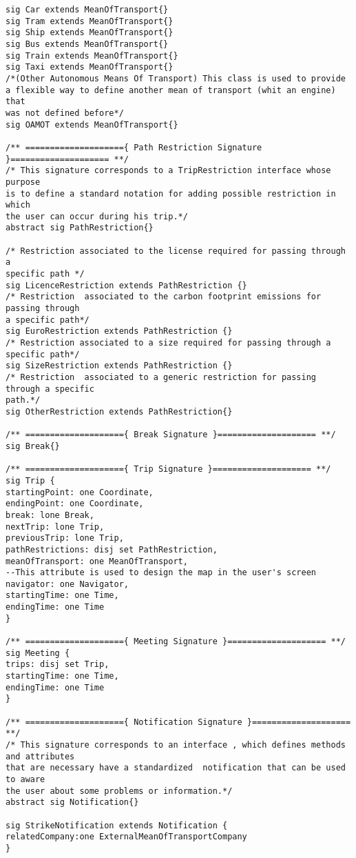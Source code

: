 \documentclass[a4paper,leqno]{book}
\begin{document}
\begin{lstlisting}
sig Car extends MeanOfTransport{}
sig Tram extends MeanOfTransport{}
sig Ship extends MeanOfTransport{}
sig Bus extends MeanOfTransport{}
sig Train extends MeanOfTransport{}
sig Taxi extends MeanOfTransport{}
/*(Other Autonomous Means Of Transport) This class is used to provide
a flexible way to define another mean of transport (whit an engine) that
was not defined before*/
sig OAMOT extends MeanOfTransport{}

/** ===================={ Path Restriction Signature }==================== **/
/* This signature corresponds to a TripRestriction interface whose purpose
is to define a standard notation for adding possible restriction in which
the user can occur during his trip.*/
abstract sig PathRestriction{}

/* Restriction associated to the license required for passing through a
specific path */
sig LicenceRestriction extends PathRestriction {}
/* Restriction  associated to the carbon footprint emissions for passing through
a specific path*/
sig EuroRestriction extends PathRestriction {}
/* Restriction associated to a size required for passing through a specific path*/
sig SizeRestriction extends PathRestriction {}
/* Restriction  associated to a generic restriction for passing through a specific
path.*/
sig OtherRestriction extends PathRestriction{}

/** ===================={ Break Signature }==================== **/
sig Break{}

/** ===================={ Trip Signature }==================== **/
sig Trip {
startingPoint: one Coordinate,
endingPoint: one Coordinate,
break: lone Break,
nextTrip: lone Trip,
previousTrip: lone Trip,
pathRestrictions: disj set PathRestriction,
meanOfTransport: one MeanOfTransport,
--This attribute is used to design the map in the user's screen
navigator: one Navigator,
startingTime: one Time,
endingTime: one Time
}

/** ===================={ Meeting Signature }==================== **/
sig Meeting {
trips: disj set Trip,
startingTime: one Time,
endingTime: one Time
}

/** ===================={ Notification Signature }==================== **/
/* This signature corresponds to an interface , which defines methods and attributes
that are necessary have a standardized  notification that can be used to aware
the user about some problems or information.*/
abstract sig Notification{}

sig StrikeNotification extends Notification {
relatedCompany:one ExternalMeanOfTransportCompany
}


\end{lstlisting}
\end{document}

